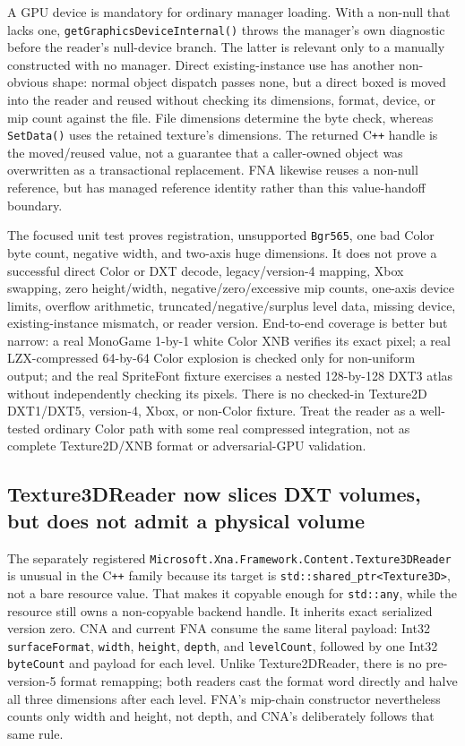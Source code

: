 A GPU device is mandatory for ordinary manager loading. With a non-null 
that lacks one, \texttt{getGraphicsDeviceInternal()} throws the manager's own diagnostic before
the reader's null-device branch. The latter is relevant only to a manually constructed
 with no manager. Direct existing-instance use has another non-obvious
shape: normal object dispatch passes none, but a direct boxed  is moved into
the reader and reused without checking its dimensions, format, device, or mip count against the
file. File dimensions determine the byte check, whereas \texttt{SetData()} uses the retained
texture's dimensions. The returned C\texttt{++} handle is the moved/reused value, not a guarantee
that a caller-owned object was overwritten as a transactional replacement. FNA likewise reuses a
non-null reference, but has managed reference identity rather than this value-handoff boundary.

The focused unit test proves registration, unsupported \texttt{Bgr565}, one bad Color byte count,
negative width, and two-axis huge dimensions. It does not prove a successful direct Color or DXT
decode, legacy/version-4 mapping, Xbox swapping, zero height/width, negative/zero/excessive mip
counts, one-axis device limits, overflow arithmetic, truncated/negative/surplus level data,
missing device, existing-instance mismatch, or reader version. End-to-end coverage is better but
narrow: a real MonoGame 1-by-1 white Color XNB verifies its exact pixel; a real LZX-compressed
64-by-64 Color explosion is checked only for non-uniform output; and the real SpriteFont fixture
exercises a nested 128-by-128 DXT3 atlas without independently checking its pixels. There is no
checked-in Texture2D DXT1/DXT5, version-4, Xbox, or non-Color fixture. Treat the reader as a
well-tested ordinary Color path with some real compressed integration, not as complete
Texture2D/XNB format or adversarial-GPU validation.

\subsection{Texture3DReader now slices DXT volumes, but does not admit a physical volume}
\label{sec:xnb-texture3d-reader-contract}

The separately registered \texttt{Microsoft.Xna.Framework.Content.Texture3DReader} is unusual in
the C\texttt{++} family because its target is \texttt{std::shared\_ptr<Texture3D>}, not a
bare resource value. That makes it copyable enough for \texttt{std::any}, while the resource still
owns a non-copyable backend handle. It inherits exact serialized version zero. CNA and current
FNA consume the same literal payload: Int32 \texttt{surfaceFormat}, \texttt{width},
\texttt{height}, \texttt{depth}, and \texttt{levelCount}, followed by one Int32 \texttt{byteCount}
and payload for each level. Unlike Texture2DReader, there is no pre-version-5 format remapping;
both readers cast the format word directly and halve all three dimensions after each level.
FNA's mip-chain constructor nevertheless counts only width and height, not depth, and CNA's
 deliberately follows that same rule.

